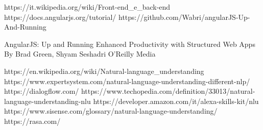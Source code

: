\begin{thebibliography}{99}

https://it.wikipedia.org/wiki/Front-end_e_back-end
https://docs.angularjs.org/tutorial/
https://github.com/Wabri/angularJS-Up-And-Running

AngularJS: Up and Running
Enhanced Productivity with Structured Web Apps
By Brad Green, Shyam Seshadri 
O'Reilly Media

https://en.wikipedia.org/wiki/Natural-language_understanding
https://www.expertsystem.com/natural-language-understanding-different-nlp/
https://dialogflow.com/
https://www.techopedia.com/definition/33013/natural-language-understanding-nlu
https://developer.amazon.com/it/alexa-skills-kit/nlu
https://www.sisense.com/glossary/natural-language-understanding/
https://rasa.com/



\end{thebibliography}
